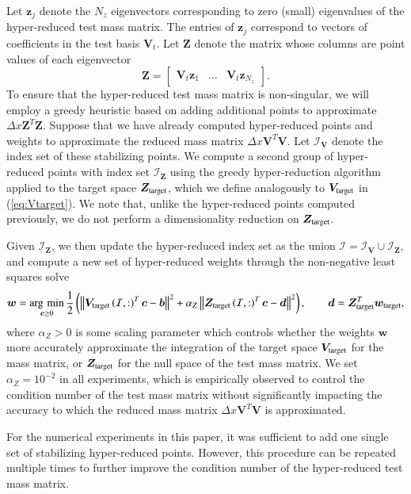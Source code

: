 \documentclass[preprint,10pt]{elsarticle}
\theoremstyle{definition}
\theoremstyle{lemma}
\theoremstyle{theorem}
\theoremstyle{assumption}
\DeclareMathOperator*{\argmin}{\arg\,\min}
\newcommand{\nor}[1]{\left\| #1 \right\|}
\newcommand{\LRp}[1]{\left( #1 \right)}
\begin{document}
Let $\bm{z}_j$ denote the $N_z$ eigenvectors corresponding to zero (small) eigenvalues of the hyper-reduced test mass matrix.  The entries of $\bm{z}_j$ correspond to vectors of coefficients in the test basis $\bm{V}_t$.  Let $\bm{Z}$ denote the matrix whose columns are point values of each eigenvector
\[
\bm{Z} = \begin{bmatrix}
\bm{V}_t\bm{z}_1 & \ldots & \bm{V}_t\bm{z}_{N_z}
\end{bmatrix}.
\]
To ensure that the hyper-reduced test mass matrix is non-singular, we will employ a greedy heuristic based on adding additional points to approximate $\Delta x\bm{Z}^T\bm{Z}$.  Suppose that we have already computed hyper-reduced points and weights to approximate the reduced mass matrix $\Delta x\bm{V}^T\bm{V}$.   Let $\mathcal{I}_{\bm{V}}$ denote the index set of these stabilizing points.  We compute a second group of hyper-reduced points with index set $\mathcal{I}_{\bm{Z}}$  using the greedy hyper-reduction algorithm applied to the target space $\bm{Z}_{\rm target}$, which we define analogously to $\bm{V}_{\rm target}$ in (\ref{eq:Vtarget}).  We note that, unlike the hyper-reduced points computed previously, we do not perform a dimensionality reduction on $\bm{Z}_{\rm target}$.

Given $\mathcal{I}_{\bm{Z}}$, we then update the hyper-reduced index set as the union $\mathcal{I} = \mathcal{I}_{\bm{V}} \cup \mathcal{I}_{\bm{Z}}$, and compute a new set of hyper-reduced weights through the non-negative least squares solve
\[
\bm{w} = \argmin_{\bm{c} \geq 0} \frac{1}{2} \LRp{\nor{\bm{V}_{\rm target}\LRp{\mathcal{I},:}^T\bm{c} - \bm{b}}^2 + \alpha_Z\nor{\bm{Z}_{\rm target}\LRp{\mathcal{I},:}^T\bm{c} - \bm{d}}^2}, \qquad \bm{d} = \bm{Z}_{\rm target}^T\bm{w}_{\rm target},
\]  
where $\alpha_Z > 0$ is some scaling parameter which controls whether the weights $\bm{w}$ more accurately approximate the integration of the target space $\bm{V}_{\rm target}$ for the mass matrix, or $\bm{Z}_{\rm target}$ for the null space of the test mass matrix.  We set $\alpha_Z = 10^{-2}$ in all experiments, which is empirically observed to control the condition number of the test mass matrix without significantly impacting the accuracy to which the reduced mass matrix $\Delta x\bm{V}^T\bm{V}$ is approximated.  

For the numerical experiments in this paper, it was sufficient to add one single set of stabilizing hyper-reduced points.  However, this procedure can be repeated multiple times to further improve the condition number of the hyper-reduced test mass matrix.  
\end{document}
